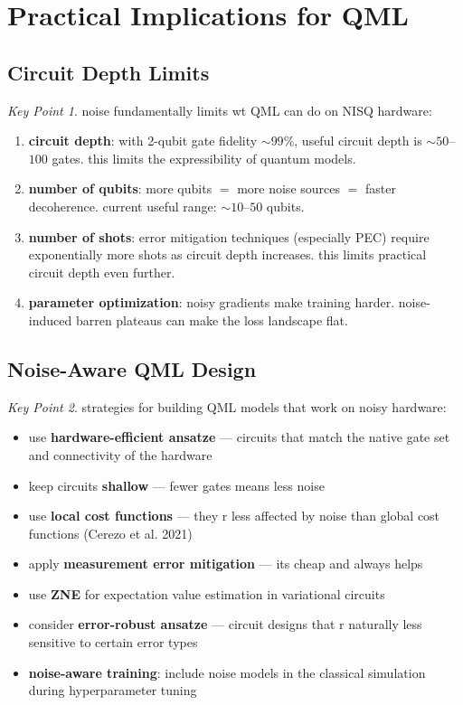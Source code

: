 \documentclass[11pt,a4paper]{article}
\theoremstyle{definition}
\theoremstyle{remark}
\newtheorem*{keypoint}{Key Point}
\begin{document}
\section{Practical Implications for QML}

\subsection{Circuit Depth Limits}

\begin{keypoint}
noise fundamentally limits wt QML can do on NISQ hardware:
\begin{enumerate}
    \item \textbf{circuit depth}: with 2-qubit gate fidelity $\sim 99\%$, useful circuit depth is $\sim 50$--$100$ gates. this limits the expressibility of quantum models.
    \item \textbf{number of qubits}: more qubits $=$ more noise sources $=$ faster decoherence. current useful range: $\sim 10$--$50$ qubits.
    \item \textbf{number of shots}: error mitigation techniques (especially PEC) require exponentially more shots as circuit depth increases. this limits practical circuit depth even further.
    \item \textbf{parameter optimization}: noisy gradients make training harder. noise-induced barren plateaus can make the loss landscape flat.
\end{enumerate}
\end{keypoint}

\subsection{Noise-Aware QML Design}

\begin{keypoint}
strategies for building QML models that work on noisy hardware:
\begin{itemize}
    \item use \textbf{hardware-efficient ansatze} --- circuits that match the native gate set and connectivity of the hardware
    \item keep circuits \textbf{shallow} --- fewer gates means less noise
    \item use \textbf{local cost functions} --- they r less affected by noise than global cost functions (Cerezo et al. 2021)
    \item apply \textbf{measurement error mitigation} --- its cheap and always helps
    \item use \textbf{ZNE} for expectation value estimation in variational circuits
    \item consider \textbf{error-robust ansatze} --- circuit designs that r naturally less sensitive to certain error types
    \item \textbf{noise-aware training}: include noise models in the classical simulation during hyperparameter tuning
\end{itemize}
\end{keypoint}
\end{document}

